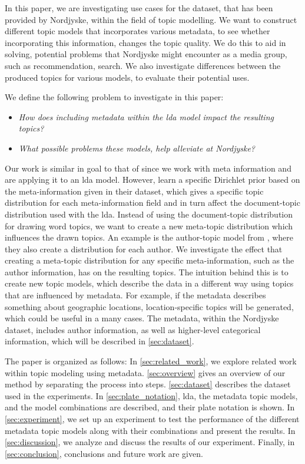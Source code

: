 In this paper, we are investigating use cases for the dataset, that has been provided by Nordjyske, within the field of topic modelling. 
We want to construct different topic models that incorporates various metadata, to see whether incorporating this information, changes the topic quality.
We do this to aid in solving, potential problems that Nordjyske might encounter as a media group, such as recommendation, search.
We also investigate differences between the produced topics for various models, to evaluate their potential uses.

We define the following problem to investigate in this paper:

\begin{itemize}
	\item \textit{How does including metadata within the \gls{lda} model impact the resulting topics?}
	\item \textit{What possible problems these models, help alleviate at Nordjyske?}
\end{itemize}

Our work is similar in goal to that of \citet{MetaLDA2017} since we work with meta information and are applying it to an \gls{lda} model.
However, \citet{MetaLDA2017} learn a specific Dirichlet prior based on the meta-information given in their dataset, which gives a specific topic distribution for each meta-information field and in turn affect the document-topic distribution used with the \gls{lda}.
Instead of using the document-topic distribution for drawing word topics, we want to create a new meta-topic distribution which influences the drawn topics.
An example is the author-topic model from \citet{author_topic_2012}, where they also create a distribution for each author.
We investigate the effect that creating a meta-topic distribution for any specific meta-information, such as the author information, has on the resulting topics.
The intuition behind this is to create new topic models, which describe the data in a different way using topics that are influenced by metadata.
For example, if the metadata describes something about geographic locations, location-specific topics will be generated, which could be useful in a many cases.
The metadata, within the Nordjyske dataset, includes author information, as well as higher-level categorical information, which will be described in \autoref{sec:dataset}.

The paper is organized as follows:
In \autoref{sec:related_work}, we explore related work within topic modeling using metadata.
\autoref{sec:overview} gives an overview of our method by separating the process into steps.
\autoref{sec:dataset} describes the dataset used in the experiments.
In \autoref{sec:plate_notation}, \gls{lda}, the metadata topic models, and the model combinations are described, and their plate notation is shown.
In \autoref{sec:experiment}, we set up an experiment to test the performance of the different metadata topic models along with their combinations and present the results.
In \autoref{sec:discussion}, we analyze and discuss the results of our experiment.
Finally, in \autoref{sec:conclusion}, conclusions and future work are given.
